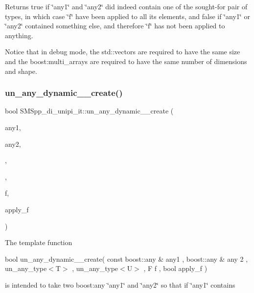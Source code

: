 Returns true if \char`\"{}any1\char`\"{} and \char`\"{}any2\char`\"{} did indeed contain one of the sought-\/for pair of types, in which case \char`\"{}f\char`\"{} have been applied to all its elements, and false if \char`\"{}any1\char`\"{} or \char`\"{}any2\char`\"{} contained something else, and therefore \char`\"{}f\char`\"{} has not been applied to anything.

Notice that in debug mode, the std\+::vectors are required to have the same size and the boost\+:multi\+\_\+arrays are required to have the same number of dimensions and shape. \mbox{\label{group__boost__any__stuff_ga3a3356c9acf06be5d03879fed1d4b920}} 
\subsubsection{\texorpdfstring{un\+\_\+any\+\_\+dynamic\+\_\+\_\+create()}{un\_any\_dynamic\_2\_create()}}
{\footnotesize\ttfamily bool S\+M\+Spp\+\_\+di\+\_\+unipi\+\_\+it\+::un\+\_\+any\+\_\+dynamic\+\_\+\_\+create (\begin{DoxyParamCaption}\item[{const boost\+::any \&}]{any1,  }\item[{boost\+::any \&}]{any2,  }\item[{\mbox{\hyperlink{struct_s_m_spp__di__unipi__it_1_1un__any__type}{un\+\_\+any\+\_\+type}}$<$ T $>$}]{,  }\item[{\mbox{\hyperlink{struct_s_m_spp__di__unipi__it_1_1un__any__type}{un\+\_\+any\+\_\+type}}$<$ U $>$}]{,  }\item[{F}]{f,  }\item[{bool}]{apply\+\_\+f }\end{DoxyParamCaption})}

The template function

bool un\+\_\+any\+\_\+dynamic\+\_\+\_\+create( const boost\+::any \& any1 , boost\+::any \& any 2 , un\+\_\+any\+\_\+type$<$\+T$>$ , un\+\_\+any\+\_\+type$<$\+U$>$ , F f , bool apply\+\_\+f )

is intended to take two boost\+:any \char`\"{}any1\char`\"{} and \char`\"{}any2\char`\"{} so that if \char`\"{}any1\char`\"{} contains


